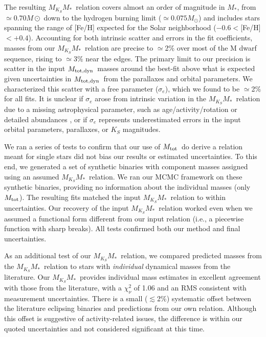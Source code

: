 \documentclass[twocolumn]{aastex62}
\newcommand{\mmk}{$M_{K_S}$\textendash$M_*$}
\newcommand{\mtot}{$M_{\rm{tot}}$}
\newcommand{\mdyn}{$M_{\rm{tot,dyn}}$}
\begin{document}
The resulting \mmk\ relation covers almost an order of magnitude in $M_*$, from $\simeq0.70M\odot$ down to the hydrogen burning limit ($\simeq0.075M_\odot$) and includes stars spanning the range of [Fe/H] expected for the Solar neighborhood ($-0.6<$[Fe/H]$<+0.4$). Accounting for both intrinsic scatter and errors in the fit coefficients, masses from our \mmk\ relation are precise to $\simeq$2\% over most of the M dwarf sequence, rising to $\simeq3\%$ near the edges. The primary limit to our precision is scatter in the input \mdyn\ masses around the best-fit above what is expected given uncertainties in \mdyn\ from the parallaxes and orbital parameters. We characterized this scatter with a free parameter ($\sigma_e$), which we found to be $\simeq$2\% for all fits. It is unclear if $\sigma_e$ arose from intrinsic variation in the \mmk\ relation due to a missing astrophysical parameter, such as age/activity/rotation \citep[e.g.,][]{Kraus2011,Feiden:2016aa,Somers2017} or detailed abundances \citep[e.g.,][]{2017A&A...604A..97L,Veyette2017}, or if $\sigma_e$ represents underestimated errors in the input orbital parameters, parallaxes, or $K_S$ magnitudes. 

We ran a series of tests to confirm that our use of \mtot\ do derive a relation meant for single stars did not bias our results or estimated uncertainties. To this end, we generated a set of synthetic binaries with component masses assigned using an assumed \mmk\ relation. We ran our MCMC framework on these synthetic binaries, providing no information about the individual masses (only \mtot). The resulting fits matched the input \mmk\ relation to within uncertainties. Our recovery of the input \mmk\ relation worked even when we assumed a functional form different from our input relation (i.e., a piecewise function with sharp breaks). All tests confirmed both our method and final uncertainties.

As an additional test of our \mmk\ relation, we compared predicted masses from the \mmk\ relation to stars with {\it individual} dynamical masses from the literature. Our \mmk\ provides individual mass estimates in excellent agreement with those from the literature, with a $\chi^2_\nu$ of 1.06 and an RMS consistent with measurement uncertainties. There is a small ($\lesssim$2\%) systematic offset between the literature eclipsing binaries and predictions from our own relation. Although this offset is suggestive of activity-related issues, the difference is within our quoted uncertainties and not considered significant at this time. 
\end{document}

